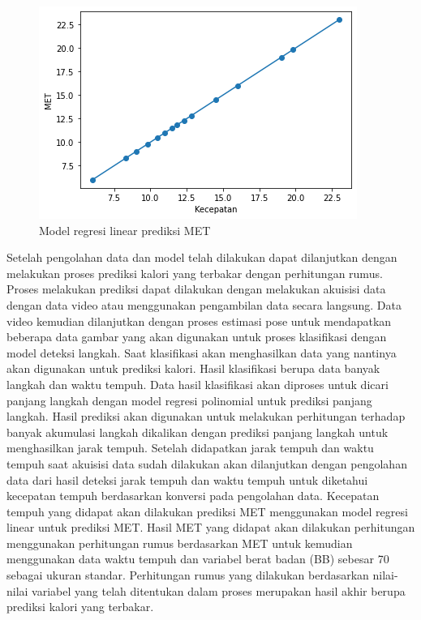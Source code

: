 \begin{figure}[H]
  \centering
  \includegraphics[scale=0.8]{gambar/model regresi met.png}
  \caption{Model regresi linear prediksi MET}
  \label{fig:ModelRegresiMET}
\end{figure}

Setelah pengolahan data dan model telah dilakukan dapat dilanjutkan dengan melakukan proses prediksi kalori yang terbakar dengan perhitungan rumus. Proses melakukan prediksi dapat dilakukan dengan melakukan akuisisi data dengan data video atau menggunakan pengambilan data secara langsung. Data video kemudian dilanjutkan dengan proses estimasi pose untuk mendapatkan beberapa data gambar yang akan digunakan untuk proses klasifikasi dengan model deteksi langkah. Saat klasifikasi akan menghasilkan data yang nantinya akan digunakan untuk prediksi kalori. Hasil klasifikasi berupa data banyak langkah dan waktu tempuh. Data hasil klasifikasi akan diproses untuk dicari panjang langkah dengan model regresi polinomial untuk prediksi panjang langkah. Hasil prediksi akan digunakan untuk melakukan perhitungan terhadap banyak akumulasi langkah dikalikan dengan prediksi panjang langkah untuk menghasilkan jarak tempuh. Setelah didapatkan jarak tempuh dan waktu tempuh saat akuisisi data sudah dilakukan akan dilanjutkan dengan pengolahan data dari hasil deteksi jarak tempuh dan waktu tempuh untuk diketahui kecepatan tempuh berdasarkan konversi pada pengolahan data. Kecepatan tempuh yang didapat akan dilakukan prediksi MET menggunakan model regresi linear untuk prediksi MET. Hasil MET yang didapat akan dilakukan perhitungan menggunakan perhitungan rumus berdasarkan MET untuk kemudian menggunakan data waktu tempuh dan variabel berat badan (BB) sebesar 70 sebagai ukuran standar. Perhitungan rumus yang dilakukan berdasarkan nilai-nilai variabel yang telah ditentukan dalam proses merupakan hasil akhir berupa prediksi kalori yang terbakar.
